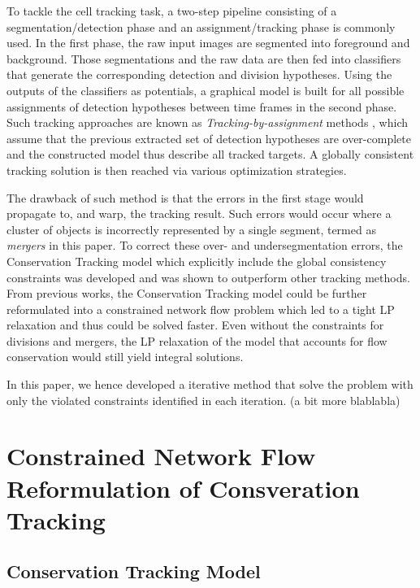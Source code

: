 \documentclass[10pt,twocolumn,letterpaper]{article}
\begin{document}
To tackle the cell tracking task, a two-step pipeline \cite{yilmaz2006object} consisting of a segmentation/detection phase and an assignment/tracking phase is commonly used. In the first phase, the raw input images are segmented into foreground and background. Those segmentations and the raw data are then fed into classifiers that generate the corresponding detection and division hypotheses. Using the outputs of the classifiers as potentials, a graphical model is built for all possible assignments of  detection hypotheses between time frames in the second phase. Such tracking approaches are known as \textit{Tracking-by-assignment} methods \cite{bise2011reliable,padfield2011coupled}, which assume that the previous extracted set of detection hypotheses are over-complete and the constructed model thus describe all tracked targets. A globally consistent tracking solution is then reached via various optimization strategies.

The drawback of such method is that the errors in the first stage would propagate to, and warp, the tracking result. Such errors would occur where a cluster of objects is incorrectly represented by a single segment, termed as \textit{mergers} in this paper. To correct these over- and undersegmentation errors, the Conservation Tracking model which explicitly include the global consistency constraints was developed and was shown to outperform other tracking methods. From previous works, the Conservation Tracking model could be further reformulated into a constrained network flow problem which led to a tight LP relaxation and thus could be solved faster. Even without the constraints for divisions and mergers, the LP relaxation of the model that accounts for flow conservation would still yield integral solutions.

In this paper, we hence developed a iterative method that solve the problem with only the violated constraints identified in each iteration. (a bit more blablabla)


\section{Constrained Network Flow Reformulation of Consveration Tracking}


\subsection{Conservation Tracking Model}
\end{document}
